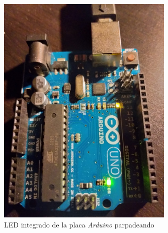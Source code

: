\documentclass[10pt,a4paper]{report}
\begin{document}
	\begin{figure}[H]\label{fig:res1}
		\centering
		\includegraphics[width=0.75\textwidth]{arduino.jpeg}
		\caption{LED integrado de la placa \textit{Arduino} parpadeando}
	\end{figure}
	
\end{document}
